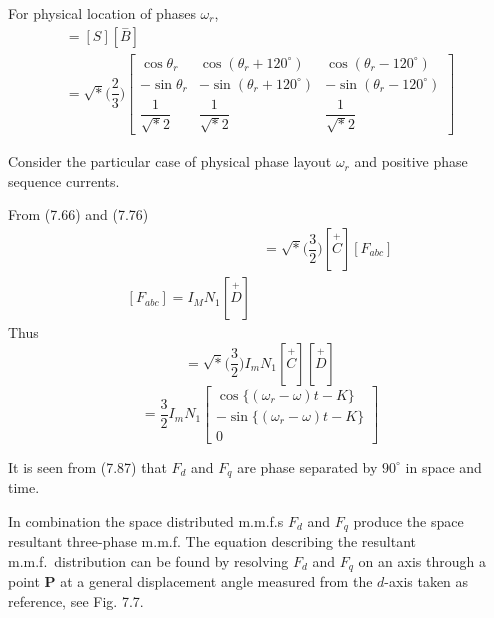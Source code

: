 \documentclass[a4paper,numbers=noenddot,12pt]{scrbook}
\begin{document}
    For physical location of phases $\omega_r$,  %
    \begin{multline}
        [\overset{-}{C}] = [S] [\overset{-}{B}] \\
        = \sqrt*{\Big( \dfrac{2}{3} \Big)}
        \begin{bmatrix}
            \cos \theta_r & \cos (\theta_r + 120^{\circ}) & \cos (\theta_r - 120^{\circ}) \\
            - \sin \theta_r & - \sin (\theta_r + 120^{\circ}) & - \sin (\theta_r - 120^{\circ}) \\
            \dfrac{1}{\sqrt*{2}} & \dfrac{1}{\sqrt*{2}} & \dfrac{1}{\sqrt*{2}}
        \end{bmatrix}
        \label{eq:Eq7.83}
    \end{multline}

    Consider the particular  case of physical phase layout $\omega_r$ and positive phase sequence currents. %

    From (7.66) and  (7.76)
    \begin{align}
        [F_{d q \gamma}] &=  \sqrt*{\Big( \dfrac{3}{2} \Big)} [\overset{+}{C}] [F_{abc}] \\
        [F_{abc}] = I_M N_1 [\overset{+}{D}]
        \label{eq:Eq7.85}
    \end{align}
    Thus
    \begin{equation}
        [F_{d q \gamma}] =  \sqrt*{\Big( \dfrac{3}{2} \Big)} I_m N_1 [\overset{+}{C}] [\overset{+}{D}]
        \label{eq:Eq7.86}
    \end{equation}
    \begin{equation}
        [F_{d q \gamma}] = \dfrac{3}{2} I_m N_1
        \begin{bmatrix}
            \cos \{(\omega_r -\omega)t - K\} \\
            -\sin \{(\omega_r -\omega)t - K\} \\
            0
        \end{bmatrix}
        \label{eq:Eq7.87}
    \end{equation}

    It is seen from (7.87) that $F_d$ and $F_q$ are phase separated by $90^{\circ}$ in space and time.

    In combination the space distributed m.m.f.s $F_d$ and $F_q$ produce the space resultant three-phase m.m.f. The equation describing the resultant m.m.f.\ distribution can be found by resolving $F_d$ and $F_q$ on an axis through a point \textbf{P} at a general displacement angle measured from the $d$-axis taken as reference, see Fig. 7.7.
\end{document}

